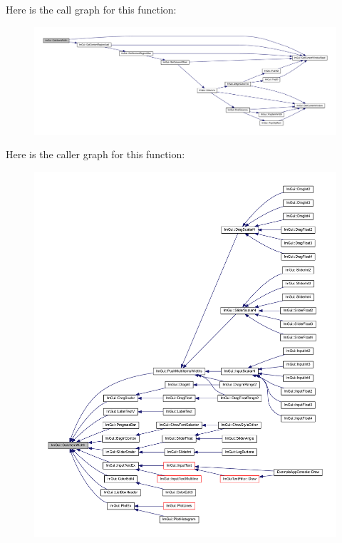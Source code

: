 Here is the call graph for this function\+:
\nopagebreak
\begin{figure}[H]
\begin{center}
\leavevmode
\includegraphics[width=350pt]{namespace_im_gui_ab3b3ba92ebd8bca4a552dd93321a1994_cgraph}
\end{center}
\end{figure}
Here is the caller graph for this function\+:
\nopagebreak
\begin{figure}[H]
\begin{center}
\leavevmode
\includegraphics[width=350pt]{namespace_im_gui_ab3b3ba92ebd8bca4a552dd93321a1994_icgraph}
\end{center}
\end{figure}
\mbox{\label{namespace_im_gui_ae5319370628374ef8febf0c25c285b7e}} 
